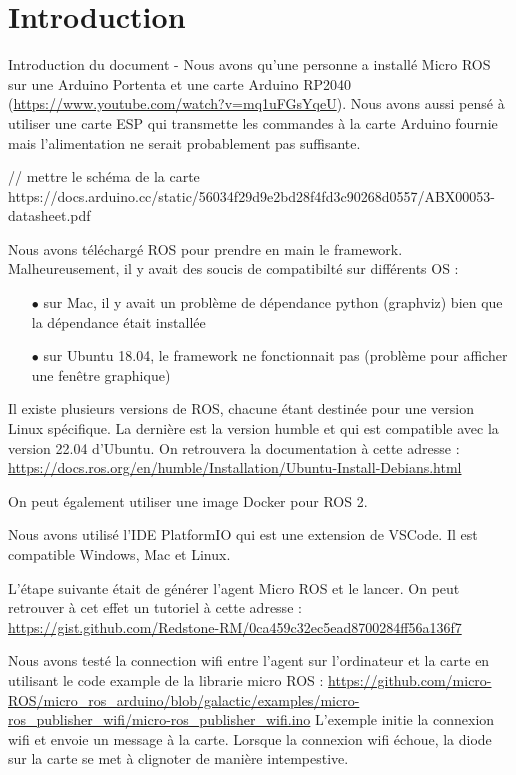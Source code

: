 	\chapter{Introduction}

Introduction du document - 	Nous avons qu'une personne a installé Micro ROS sur une Arduino Portenta et une carte Arduino RP2040 (\url{https://www.youtube.com/watch?v=mq1uFGsYqeU}).
Nous avons aussi pensé à utiliser une carte ESP qui transmette les commandes à la carte Arduino fournie mais l'alimentation ne serait probablement pas suffisante.

// mettre le schéma de la carte
https://docs.arduino.cc/static/56034f29d9e2bd28f4fd3c90268d0557/ABX00053-datasheet.pdf

Nous avons téléchargé ROS pour prendre en main le framework.
Malheureusement, il y avait des soucis de compatibilté sur différents OS :

\begin{itemize}
	\item[$\bullet$] sur Mac, il y avait un problème de dépendance python (graphviz) bien que la dépendance était installée
	\item[$\bullet$]sur Ubuntu 18.04, le framework ne fonctionnait pas (problème pour afficher une fenêtre graphique)
\end{itemize}

Il existe plusieurs versions de ROS, chacune étant destinée pour une version Linux spécifique.
La dernière est la version humble et qui est compatible avec la version 22.04 d'Ubuntu.
On retrouvera la documentation à cette adresse : \url{https://docs.ros.org/en/humble/Installation/Ubuntu-Install-Debians.html}

On peut également utiliser une image Docker pour ROS 2.\linebreak

Nous avons utilisé l'IDE PlatformIO qui est une extension de VSCode. Il est compatible Windows, Mac et Linux.

L'étape suivante était de générer l'agent Micro ROS et le lancer. On peut retrouver à cet effet un tutoriel à cette adresse :
\url{https://gist.github.com/Redstone-RM/0ca459c32ec5ead8700284ff56a136f7}\linebreak

Nous avons testé la connection wifi entre l'agent sur l'ordinateur et la carte en utilisant le code example de la librarie micro ROS :
\url{https://github.com/micro-ROS/micro_ros_arduino/blob/galactic/examples/micro-ros_publisher_wifi/micro-ros_publisher_wifi.ino}
L'exemple initie la connexion wifi et envoie un message à la carte.
Lorsque la connexion wifi échoue, la diode sur la carte se met à clignoter de manière intempestive.\linebreak


